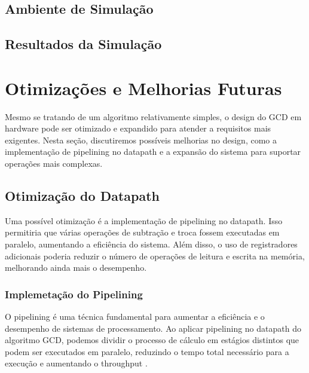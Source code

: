 \documentclass[a4paper,11pt]{article} %
\begin{document}
\subsection{Ambiente de Simulação}

\subsection{Resultados da Simulação}

\section{Otimizações e Melhorias Futuras}

Mesmo se tratando de um algoritmo relativamente simples, o design do GCD em hardware pode ser otimizado e expandido para atender a requisitos mais exigentes. Nesta seção, discutiremos possíveis melhorias no design, como a implementação de pipelining no datapath e a expansão do sistema para suportar operações mais complexas.




\subsection{Otimização do Datapath}
Uma possível otimização é a implementação de pipelining no datapath. Isso permitiria que várias operações de subtração e troca fossem executadas em paralelo, aumentando a eficiência do sistema. Além disso, o uso de registradores adicionais poderia reduzir o número de operações de leitura e escrita na memória, melhorando ainda mais o desempenho.


\subsubsection{Implemetação do Pipelining}
O pipelining é uma técnica fundamental para aumentar a eficiência e o desempenho de sistemas de processamento. Ao aplicar pipelining no datapath do algoritmo GCD, podemos dividir o processo de cálculo em estágios distintos que podem ser executados em paralelo, reduzindo o tempo total necessário para a execução e aumentando o throughput \cite{Hennessy2017}.
\end{document}
